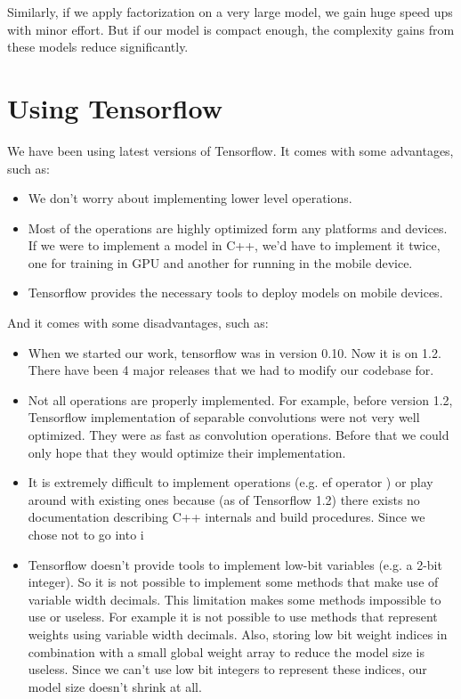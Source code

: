 Similarly, if we apply factorization on a very large model, we gain huge speed ups with minor effort. But if our model is compact enough, the complexity gains from these models reduce significantly.

\section{Using Tensorflow}
We have been using latest versions of Tensorflow. It comes with some advantages, such as:
\begin{itemize}
\item We don't worry about implementing lower level operations.
\item Most of the operations are highly optimized form any platforms and devices. If we were to implement a model in C++, we'd have to implement it twice, one for training in GPU and another for running in the mobile device. 
\item Tensorflow provides the necessary tools to deploy models on mobile devices.
\end{itemize}

And it comes with some disadvantages, such as:

\begin{itemize}
\item When we started our work, tensorflow was in version 0.10. Now it is on 1.2. There have been 4 major releases that we had to modify our codebase for.
\item Not all operations are properly implemented. For example, before version 1.2, Tensorflow implementation of separable convolutions were not very well optimized. They were as fast as convolution operations. Before that we could only hope that they would optimize their implementation.
\item It is extremely difficult to implement operations (e.g. ef operator \cite{afrasiyabi2017energy}) or play around with existing ones because (as of Tensorflow 1.2) there exists no documentation describing C++ internals and build procedures. Since we chose not to go into i
\item Tensorflow doesn't provide tools to implement low-bit variables (e.g. a 2-bit integer). So it is not possible to implement some methods that make use of variable width decimals. This limitation makes some methods impossible to use or useless. For example it is not possible to use methods that represent weights using variable width decimals. Also, storing low bit weight indices in combination with a small global weight array to reduce the model size is useless. Since we can't use low bit integers to represent these indices, our model size doesn't shrink at all.
\end{itemize}

